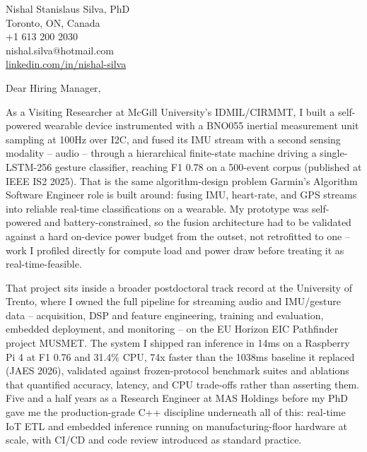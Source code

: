 \documentclass[11pt]{article}
\begin{document}
\pagestyle{empty}

\begin{flushright}
Nishal Stanislaus Silva, PhD \\
Toronto, ON, Canada \\
+1 613 200 2030 \\
nishal.silva@hotmail.com \\
\href{https://www.linkedin.com/in/nishal-silva}{linkedin.com/in/nishal-silva}
\end{flushright}

\noindent Dear Hiring Manager,

\vspace{0.5em}
\noindent As a Visiting Researcher at McGill University's IDMIL/CIRMMT, I built a self-powered wearable device instrumented with a BNO055 inertial measurement unit sampling at 100Hz over I2C, and fused its IMU stream with a second sensing modality -- audio -- through a hierarchical finite-state machine driving a single-LSTM-256 gesture classifier, reaching F1 0.78 on a 500-event corpus (published at IEEE IS2 2025). That is the same algorithm-design problem Garmin's Algorithm Software Engineer role is built around: fusing IMU, heart-rate, and GPS streams into reliable real-time classifications on a wearable. My prototype was self-powered and battery-constrained, so the fusion architecture had to be validated against a hard on-device power budget from the outset, not retrofitted to one -- work I profiled directly for compute load and power draw before treating it as real-time-feasible.

\vspace{0.5em}
\noindent That project sits inside a broader postdoctoral track record at the University of Trento, where I owned the full pipeline for streaming audio and IMU/gesture data -- acquisition, DSP and feature engineering, training and evaluation, embedded deployment, and monitoring -- on the EU Horizon EIC Pathfinder project MUSMET. The system I shipped ran inference in 14ms on a Raspberry Pi 4 at F1 0.76 and 31.4\% CPU, 74x faster than the 1038ms baseline it replaced (JAES 2026), validated against frozen-protocol benchmark suites and ablations that quantified accuracy, latency, and CPU trade-offs rather than asserting them. Five and a half years as a Research Engineer at MAS Holdings before my PhD gave me the production-grade C++ discipline underneath all of this: real-time IoT ETL and embedded inference running on manufacturing-floor hardware at scale, with CI/CD and code review introduced as standard practice.
\end{document}
